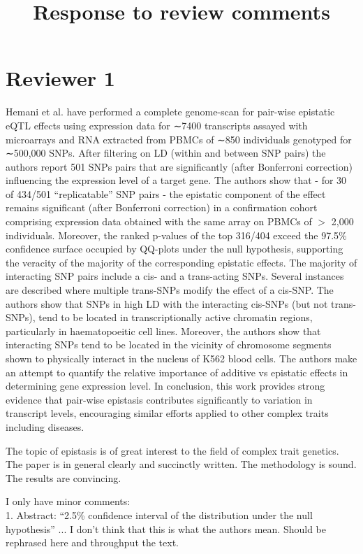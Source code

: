 \documentclass{article}
\title{Response to review comments}
\date{}
\author{}
\begin{document}
\maketitle



\section{Reviewer 1}

Hemani et al. have performed a complete genome-scan for pair-wise epistatic eQTL effects using expression data for ∼7400 transcripts assayed with microarrays and RNA extracted from PBMCs of ∼850 individuals genotyped for ∼500,000 SNPs. After filtering on LD (within and between SNP pairs) the authors report 501 SNPs pairs that are significantly (after Bonferroni correction) influencing the expression level of a target gene. The authors show that - for 30 of 434/501 “replicatable” SNP pairs - the epistatic component of the effect remains significant (after Bonferroni correction) in a confirmation cohort comprising expression data obtained with the same array on PBMCs of $>$ 2,000 individuals. Moreover, the ranked p-values of the top 316/404 exceed the 97.5\% confidence surface occupied by QQ-plots under the null hypothesis, supporting the veracity of the majority of the corresponding epistatic effects. The majority of interacting SNP pairs include a cis- and a trans-acting SNPs. Several instances are described where multiple trans-SNPs modify the effect of a cis-SNP. The authors show that SNPs in high LD with the interacting cis-SNPs (but not trans-SNPs), tend to be located in transcriptionally active chromatin regions, particularly in haematopoeitic cell lines. Moreover, the authors show that interacting SNPs tend to be located in the vicinity of chromosome segments shown to physically interact in the nucleus of K562 blood cells. The authors make an attempt to quantify the relative importance of additive vs epistatic effects in determining gene expression level. In conclusion, this work provides strong evidence that pair-wise epistasis contributes significantly to variation in transcript levels, encouraging similar efforts applied to other complex traits including diseases. 

The topic of epistasis is of great interest to the field of complex trait genetics. The paper is in general clearly and succinctly written. The methodology is sound. The results are convincing.

I only have minor comments: \\
1. Abstract: “2.5\% confidence interval of the distribution under the null hypothesis” ... I don’t think that this is what the authors mean. Should be rephrased here and throughput the text.
\end{document}
